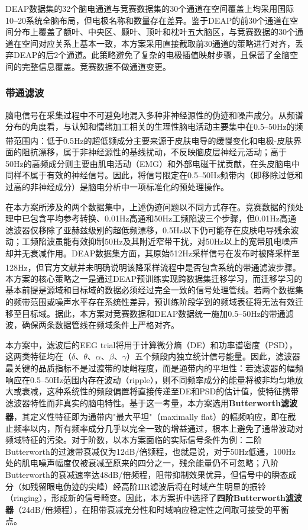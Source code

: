 \documentclass[UTF8,zihao=-4,fontset=windows]{ctexart}
\let\oldcite\cite
\renewcommand{\cite}[1]{\textsuperscript{\oldcite{#1}}}
\numberwithin{equation}{section}
\numberwithin{figure}{section}
\numberwithin{table}{section}
\begin{document}
DEAP数据集的32个脑电通道与竞赛数据集的30个通道在空间覆盖上均采用国际10--20系统全脑布局，但电极名称和数量存在差异。鉴于DEAP的前30个通道在空间分布上覆盖了额叶、中央区、颞叶、顶叶和枕叶五大脑区，与竞赛数据的30个通道在空间对应关系上基本一致，本方案采用直接截取前30通道的策略进行对齐，丢弃DEAP的后2个通道。此策略避免了复杂的电极插值映射步骤，且保留了全脑空间的完整信息覆盖。竞赛数据不做通道变更。

\subsubsection{带通滤波}

脑电信号在采集过程中不可避免地混入多种非神经源性的伪迹和噪声成分。从频谱分布的角度看，与认知和情绪加工相关的生理性脑电活动主要集中在0.5--50Hz的频带范围内\cite{eeg_preprocessing}：低于0.5Hz的超低频成分主要来源于皮肤电导的缓慢变化和电极-皮肤界面的阻抗漂移，属于非神经源性的基线扰动，不反映脑皮层神经元活动；高于50Hz的高频成分则主要由肌电活动（EMG）和外部电磁干扰贡献，在头皮脑电中同样不属于有效的神经信号。因此，将信号限定在0.5--50Hz频带内（即移除过低和过高的非神经成分）是脑电分析中一项标准化的预处理操作。

在本方案所涉及的两个数据集中，上述伪迹问题以不同方式存在。竞赛数据的预处理中已包含平均参考转换、0.01Hz高通和50Hz工频陷波三个步骤，但0.01Hz高通滤波器仅移除了亚赫兹级别的超低频漂移，0.5Hz以下仍可能存在皮肤电导残余波动；工频陷波虽能有效抑制50Hz及其附近窄带干扰，对50Hz以上的宽带肌电噪声却并无衰减作用。DEAP数据集方面，其原始512Hz采样信号在发布时被降采样至128Hz，但官方文献\cite{deap}并未明确说明该降采样流程中是否包含系统的带通滤波步骤。本方案的核心策略之一是通过DEAP预训练实现跨数据集迁移学习，而迁移学习的基本前提是源域和目标域的数据必须经过完全一致的信号处理管线。若两个数据集的频带范围或噪声水平存在系统性差异，预训练阶段学到的频域表征将无法有效迁移至目标域。据此，本方案对竞赛数据和DEAP数据统一施加0.5--50Hz的带通滤波，确保两条数据管线在频域条件上严格对齐。

本方案中，滤波后的EEG trial将用于计算微分熵（DE）和功率谱密度（PSD），这两类特征均在（$\delta$、$\theta$、$\alpha$、$\beta$、$\gamma$）五个频段内独立统计信号能量。因此，滤波器最关键的品质指标不是过渡带的陡峭程度，而是通带内的平坦性：若滤波器的幅频响应在0.5--50Hz范围内存在波动（ripple），则不同频率成分的能量将被非均匀地放大或衰减，这种系统性的频段偏置将直接传递至DE和PSD的估计值，使特征携带滤波器特性而非真实的脑电特性。基于这一考量，本方案选用\textbf{Butterworth滤波器}\cite{butterworth}，其定义性特征即为通带内"最大平坦"（maximally flat）的幅频响应，即在截止频率以内，所有频率成分几乎以完全一致的增益通过，根本上避免了通带波动对频域特征的污染。对于阶数，以本方案面临的实际信号条件为例：二阶Butterworth的过渡带衰减仅为12dB/倍频程，也就是说，对于50Hz低通，100Hz处的肌电噪声幅度仅被衰减至原来的四分之一，残余能量仍不可忽略；八阶Butterworth的衰减速率达48dB/倍频程，阻带抑制效果优异，但信号中的瞬态成分（如残留眼电伪迹的尖峰）经高阶IIR滤波后将在时域产生明显的振铃（ringing），形成新的信号畸变。因此，本方案折中选择了\textbf{四阶Butterworth滤波器}（24dB/倍频程），在阻带衰减充分性和时域响应稳定性之间取可接受的平衡点。
\end{document}
